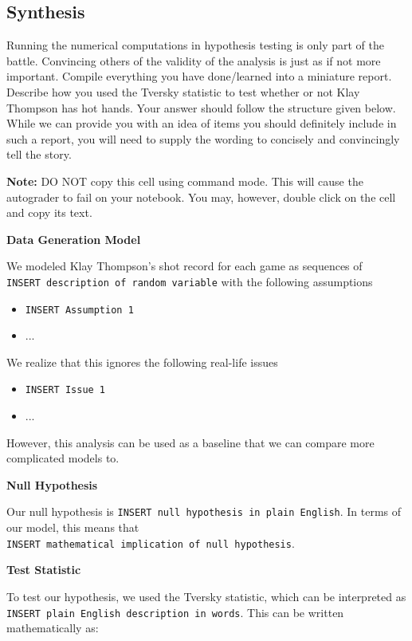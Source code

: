 \documentclass[11pt]{article}
\providecommand{\tightlist}{%
      \setlength{\itemsep}{0pt}\setlength{\parskip}{0pt}}
\begin{document}
    \subsection{Synthesis}\label{synthesis}

Running the numerical computations in hypothesis testing is only part of
the battle. Convincing others of the validity of the analysis is just as
if not more important. Compile everything you have done/learned into a
miniature report. Describe how you used the Tversky statistic to test
whether or not Klay Thompson has hot hands. Your answer should follow
the structure given below. While we can provide you with an idea of
items you should definitely include in such a report, you will need to
supply the wording to concisely and convincingly tell the story.

\textbf{Note:} DO NOT copy this cell using command mode. This will cause
the autograder to fail on your notebook. You may, however, double click
on the cell and copy its text.

\textbf{Data Generation Model}

We modeled Klay Thompson's shot record for each game as sequences of
\texttt{INSERT\ description\ of\ random\ variable} with the following
assumptions

\begin{itemize}
\tightlist
\item
  \texttt{INSERT\ Assumption\ 1}
\item
  ...
\end{itemize}

We realize that this ignores the following real-life issues

\begin{itemize}
\tightlist
\item
  \texttt{INSERT\ Issue\ 1}
\item
  ...
\end{itemize}

However, this analysis can be used as a baseline that we can compare
more complicated models to.

\textbf{Null Hypothesis}

Our null hypothesis is
\texttt{INSERT\ null\ hypothesis\ in\ plain\ English}. In terms of our
model, this means that
\texttt{INSERT\ mathematical\ implication\ of\ null\ hypothesis}.

\textbf{Test Statistic}

To test our hypothesis, we used the Tversky statistic, which can be
interpreted as \texttt{INSERT\ plain\ English\ description\ in\ words}.
This can be written mathematically as:
\end{document}
